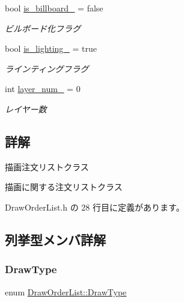 \begin{DoxyCompactItemize}
bool \mbox{\hyperlink{class_draw_order_list_ae9a77121ff108d8f0ee0c73065f99a75}{is\+\_\+billboard\+\_\+}} = false
\begin{DoxyCompactList}\small\item\em ビルボード化フラグ \end{DoxyCompactList}\item 
bool \mbox{\hyperlink{class_draw_order_list_a26e72a0f47cc2c791eeb87fe6aadeee9}{is\+\_\+lighting\+\_\+}} = true
\begin{DoxyCompactList}\small\item\em ラインティングフラグ \end{DoxyCompactList}\item 
int \mbox{\hyperlink{class_draw_order_list_aff49851688a106fc572abab6e65506b8}{layer\+\_\+num\+\_\+}} = 0
\begin{DoxyCompactList}\small\item\em レイヤー数 \end{DoxyCompactList}\end{DoxyCompactItemize}


\subsection{詳解}
描画注文リストクラス 

描画に関する注文リストクラス 

 Draw\+Order\+List.\+h の 28 行目に定義があります。



\subsection{列挙型メンバ詳解}
\mbox{\label{class_draw_order_list_a6c9b9ceb312c16d399ef355f4f3486bb}} 
\subsubsection{\texorpdfstring{Draw\+Type}{DrawType}}
{\footnotesize\ttfamily enum \mbox{\hyperlink{class_draw_order_list_a6c9b9ceb312c16d399ef355f4f3486bb}{Draw\+Order\+List\+::\+Draw\+Type}}}

